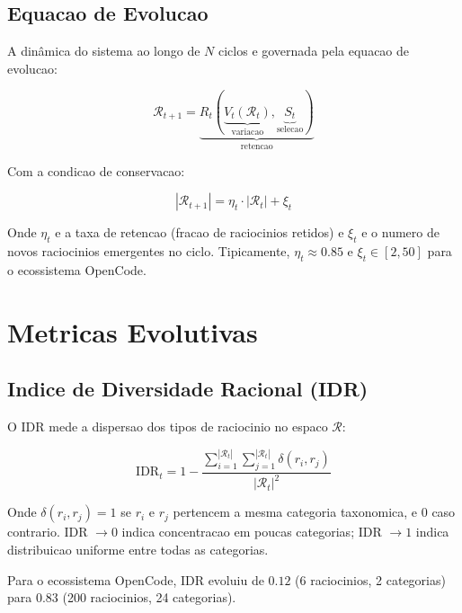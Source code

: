 \documentclass[5p]{elsarticle}
\begin{document}
\subsection{Equacao de Evolucao}

A dinâmica do sistema ao longo de $N$ ciclos e governada pela equacao de
evolucao:

\begin{equation}
  \mathcal{R}_{t+1} = \underbrace{R_t( \underbrace{V_t(\mathcal{R}_t)}_{\text{variacao}}, \underbrace{S_t}_{\text{selecao}} )}_{\text{retencao}}
\end{equation}

Com a condicao de conservacao:

\begin{equation}
  |\mathcal{R}_{t+1}| = \eta_t \cdot |\mathcal{R}_t| + \xi_t
\end{equation}

Onde $\eta_t$ e a taxa de retencao (fracao de raciocinios retidos) e $\xi_t$
e o numero de novos raciocinios emergentes no ciclo. Tipicamente,
$\eta_t \approx 0.85$ e $\xi_t \in [2, 50]$ para o ecossistema OpenCode.

\section{Metricas Evolutivas}

\subsection{Indice de Diversidade Racional (IDR)}

O IDR mede a dispersao dos tipos de raciocinio no espaco $\mathcal{R}$:

\begin{equation}
  \text{IDR}_t = 1 - \frac{\sum_{i=1}^{|\mathcal{R}_t|} \sum_{j=1}^{|\mathcal{R}_t|} \delta(r_i, r_j)}{|\mathcal{R}_t|^2}
\end{equation}

Onde $\delta(r_i, r_j) = 1$ se $r_i$ e $r_j$ pertencem a mesma categoria
taxonomica, e $0$ caso contrario. IDR $\to 0$ indica concentracao em poucas
categorias; IDR $\to 1$ indica distribuicao uniforme entre todas as categorias.

Para o ecossistema OpenCode, IDR evoluiu de $0.12$ (6 raciocinios, 2 categorias)
para $0.83$ (200 raciocinios, 24 categorias).
\end{document}
